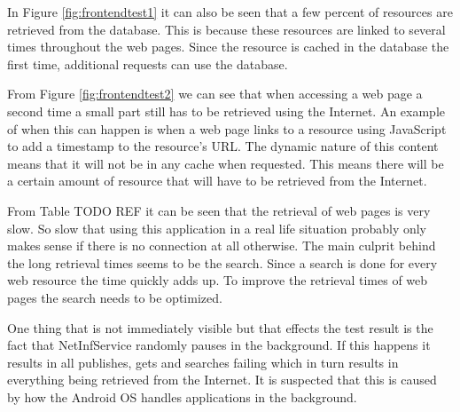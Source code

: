 In Figure \ref{fig:frontendtest1} it can also be seen that a few percent of resources are retrieved from the database. This is because these resources are linked to several times throughout the web pages. Since the resource is cached in the database the first time, additional requests can use the database.

From Figure \ref{fig:frontendtest2} we can see that when accessing a web page a second time a small part still has to be retrieved using the Internet. An example of when this can happen is when a web page links to a resource using JavaScript to add a timestamp to the resource's URL. The dynamic nature of this content means that it will not be in any cache when requested. This means there will be a certain amount of resource that will have to be retrieved from the Internet.

From Table TODO REF it can be seen that the retrieval of web pages is very slow. So slow that using this application in a real life situation probably only makes sense if there is no connection at all otherwise. The main culprit behind the long retrieval times seems to be the search. Since a search is done for every web resource the time quickly adds up. To improve the retrieval times of web pages the search needs to be optimized.

One thing that is not immediately visible but that effects the test result is the fact that NetInfService randomly pauses in the background. If this happens it results in all publishes, gets and searches failing which in turn results in everything being retrieved from the Internet. It is suspected that this is caused by how the Android OS handles applications in the background.